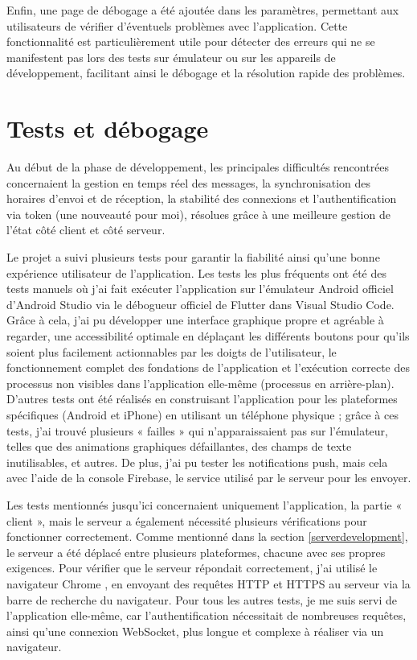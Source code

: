 \documentclass[12pt]{report}
\begin{document}
	Enfin, une page de débogage a été ajoutée dans les paramètres, permettant aux utilisateurs de vérifier d'éventuels problèmes avec l'application. Cette fonctionnalité est particulièrement utile pour détecter des erreurs qui ne se manifestent pas lors des tests sur émulateur ou sur les appareils de développement, facilitant ainsi le débogage et la résolution rapide des problèmes.
	
	\section{Tests et débogage}
	
	Au début de la phase de développement, les principales difficultés rencontrées concernaient la gestion en temps réel des messages, la synchronisation des horaires d'envoi et de réception, la stabilité des connexions et l'authentification via token (une nouveauté pour moi), résolues grâce à une meilleure gestion de l'état côté client et côté serveur.
	
	Le projet a suivi plusieurs tests pour garantir la fiabilité ainsi qu'une bonne expérience utilisateur de l'application. Les tests les plus fréquents ont été des tests manuels où j'ai fait exécuter l'application sur l'émulateur Android officiel d'Android Studio \supercite{androidstudio} via le débogueur officiel de Flutter dans Visual Studio Code. Grâce à cela, j'ai pu développer une interface graphique propre et agréable à regarder, une accessibilité optimale en déplaçant les différents boutons pour qu'ils soient plus facilement actionnables par les doigts de l'utilisateur, le fonctionnement complet des fondations de l'application et l'exécution correcte des processus non visibles dans l'application elle-même (processus en arrière-plan). D'autres tests ont été réalisés en construisant l'application pour les plateformes spécifiques (Android et iPhone) en utilisant un téléphone physique ; grâce à ces tests, j'ai trouvé plusieurs « failles » qui n'apparaissaient pas sur l'émulateur, telles que des animations graphiques défaillantes, des champs de texte inutilisables, et autres. De plus, j'ai pu tester les notifications push, mais cela avec l'aide de la console Firebase, le service utilisé par le serveur pour les envoyer.
	
	Les tests mentionnés jusqu'ici concernaient uniquement l'application, la partie « client », mais le serveur a également nécessité plusieurs vérifications pour fonctionner correctement. Comme mentionné dans la section \ref{serverdevelopment}, le serveur a été déplacé entre plusieurs plateformes, chacune avec ses propres exigences. Pour vérifier que le serveur répondait correctement, j'ai utilisé le navigateur Chrome \supercite{chrome}, en envoyant des requêtes HTTP \supercite{http} et HTTPS \supercite{https} au serveur via la barre de recherche du navigateur. Pour tous les autres tests, je me suis servi de l'application elle-même, car l'authentification nécessitait de nombreuses requêtes, ainsi qu'une connexion WebSocket, plus longue et complexe à réaliser via un navigateur.
	
\end{document}
